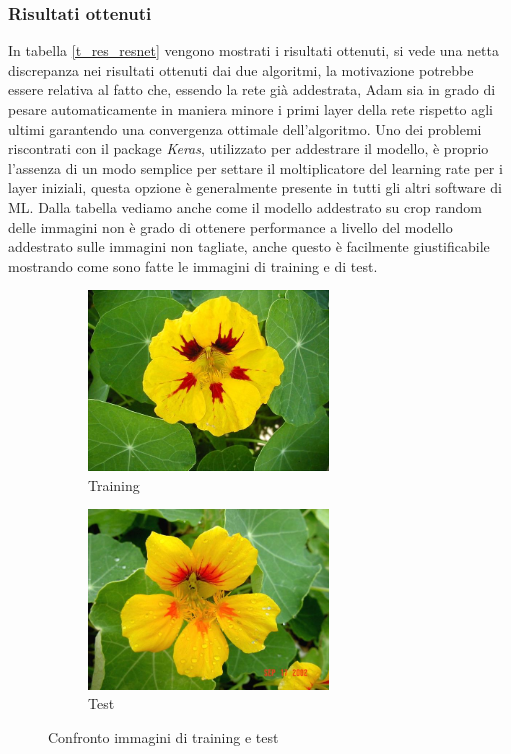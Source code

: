 \subsubsection{Risultati ottenuti}
In tabella \ref{t_res_resnet} vengono mostrati i risultati ottenuti, si vede una netta discrepanza nei risultati ottenuti dai due algoritmi, la motivazione potrebbe essere relativa al fatto che, essendo la rete già addestrata, Adam sia in grado di pesare automaticamente in maniera minore i primi layer della rete rispetto agli ultimi garantendo una convergenza ottimale dell'algoritmo.
Uno dei problemi riscontrati con il package \textit{Keras}, utilizzato per addestrare il modello, è proprio l'assenza di un modo semplice per settare il moltiplicatore del learning rate per i layer iniziali, questa opzione è generalmente presente in tutti gli altri software di ML. Dalla tabella vediamo anche come il modello addestrato su crop random delle immagini non è grado di ottenere performance a livello del modello addestrato sulle immagini non tagliate, anche questo è facilmente giustificabile mostrando come sono fatte le immagini di training e di test.

\begin{figure}[H]
  \begin{subfigure}[b]{0.45\textwidth}
  \centering
    \includegraphics[width=0.7\textwidth]{images/img_train}
    \caption{Training}
  \end{subfigure}
   \hfill
  \begin{subfigure}[b]{0.45\textwidth}
  \centering
    \includegraphics[width=0.7\textwidth]{images/img_test}
    \caption{Test}
  \end{subfigure}
  \caption{Confronto immagini di training e test}
  \vspace{-5mm}
  \label{fig_train_test}
\end{figure}

